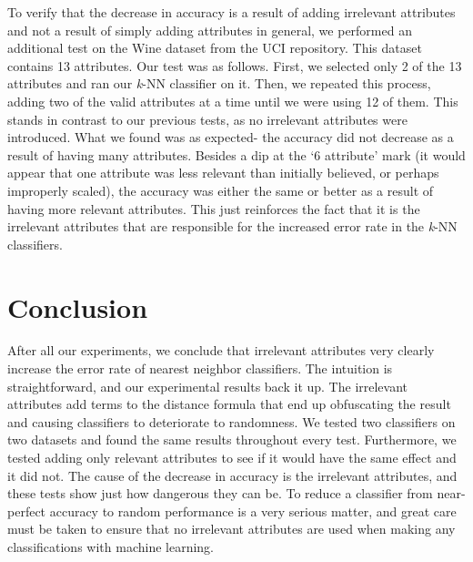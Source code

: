 \documentclass{article}
\begin{document}
To verify that the decrease in accuracy is a result of adding irrelevant attributes and not a result of simply adding attributes in general, we performed an additional test on the Wine dataset from the UCI repository. This dataset contains 13 attributes. Our test was as follows. First, we selected only 2 of the 13 attributes and ran our \textit{k}-NN classifier on it. Then, we repeated this process, adding two of the valid attributes at a time until we were using 12 of them. This stands in contrast to our previous tests, as no irrelevant attributes were introduced. What we found was as expected- the accuracy did not decrease as a result of having many attributes. Besides a dip at the ‘6 attribute’ mark (it would appear that one attribute was less relevant than initially believed, or perhaps improperly scaled), the accuracy was either the same or better as a result of having more relevant attributes. This just reinforces the fact that it is the irrelevant attributes that are responsible for the increased error rate in the \textit{k}-NN classifiers.

\section{Conclusion}

After all our experiments, we conclude that irrelevant attributes very clearly increase the error rate of nearest neighbor classifiers. The intuition is straightforward, and our experimental results back it up. The irrelevant attributes add terms to the distance formula that end up obfuscating the result and causing classifiers to deteriorate to randomness. We tested two classifiers on two datasets and found the same results throughout every test. Furthermore, we tested adding only relevant attributes to see if it would have the same effect and it did not. The cause of the decrease in accuracy is the irrelevant attributes, and these tests show just how dangerous they can be. To reduce a classifier from near-perfect accuracy to random performance is a very serious matter, and great care must be taken to ensure that no irrelevant attributes are used when making any classifications with machine learning.



 
\end{document}
